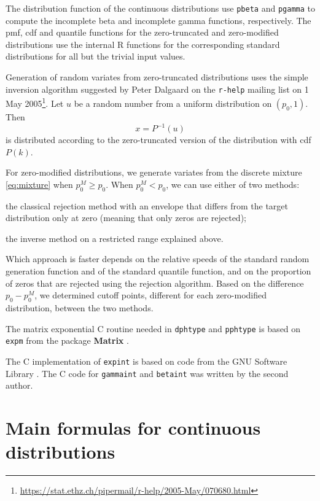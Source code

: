\documentclass[x11names]{article}
\newcommand{\proglang}[1]{\textsf{#1}}
\newcommand{\pkg}[1]{\textbf{#1}}
\newcommand{\code}[1]{\texttt{#1}}
\begin{document}
The distribution function of the continuous distributions use
\code{pbeta} and \code{pgamma} to compute the incomplete beta and
incomplete gamma functions, respectively. The pmf, cdf and quantile
functions for the zero-truncated and zero-modified distributions use
the internal \proglang{R} functions for the corresponding standard
distributions for all but the trivial input values.

Generation of random variates from zero-truncated distributions uses
the simple inversion algorithm suggested by Peter Dalgaard on the
\code{r-help} mailing list on 1 May 2005\footnote{%
  \url{https://stat.ethz.ch/pipermail/r-help/2005-May/070680.html}}.
Let $u$ be a random number from a uniform distribution on $(p_0, 1)$.
Then
\begin{equation*}
  x = P^{-1}(u)
\end{equation*}
is distributed according to the zero-truncated version of the
distribution with cdf $P(k)$.

For zero-modified distributions, we generate variates from the
discrete mixture \eqref{eq:mixture} when $p_0^M \geq p_0$. When
$p_0^M < p_0$, we can use either of two methods:
\begin{enumerate*}[i)]
\item the classical rejection method with an envelope that differs
  from the target distribution only at zero (meaning that only zeros
  are rejected);
\item the inverse method on a restricted range explained above.
\end{enumerate*}
Which approach is faster depends on the relative speeds of the
standard random generation function and of the standard quantile
function, and on the proportion of zeros that are rejected using the
rejection algorithm. Based on the difference $p_0 - p_0^M$, we
determined cutoff points, different for each zero-modified
distribution, between the two methods.

The matrix exponential \proglang{C} routine needed in \code{dphtype}
and \code{pphtype} is based on \code{expm} from the package
\pkg{Matrix} \citep{Matrix}.

The C implementation of \code{expint} is based on code from the GNU
Software Library \citep{GSL}. The \proglang{C} code for
\code{gammaint} and \code{betaint} was written by the second author.


\appendix

\section{Main formulas for continuous distributions}
\label{sec:app:continuous}
\end{document}
